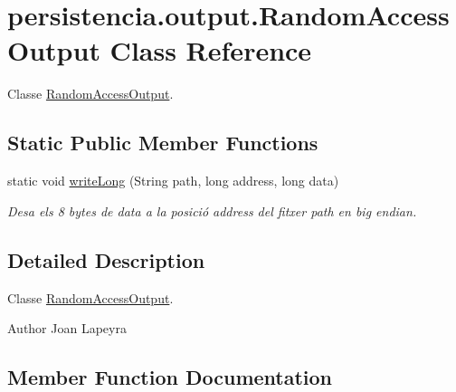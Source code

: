 \hypertarget{classpersistencia_1_1output_1_1RandomAccessOutput}{}\section{persistencia.\+output.\+Random\+Access\+Output Class Reference}
\label{classpersistencia_1_1output_1_1RandomAccessOutput}


Classe \hyperlink{classpersistencia_1_1output_1_1RandomAccessOutput}{Random\+Access\+Output}.  


\subsection*{Static Public Member Functions}
\begin{DoxyCompactItemize}
\item 
static void \hyperlink{classpersistencia_1_1output_1_1RandomAccessOutput_a204709eb802b6f934007c786a95ebe3f}{write\+Long} (String path, long address, long data)
\begin{DoxyCompactList}\small\item\em Desa els 8 bytes de data a la posició address del fitxer path en big endian. \end{DoxyCompactList}\end{DoxyCompactItemize}


\subsection{Detailed Description}
Classe \hyperlink{classpersistencia_1_1output_1_1RandomAccessOutput}{Random\+Access\+Output}. 

\begin{DoxyAuthor}{Author}
Joan Lapeyra 
\end{DoxyAuthor}


\subsection{Member Function Documentation}
\mbox{\label{classpersistencia_1_1output_1_1RandomAccessOutput_a204709eb802b6f934007c786a95ebe3f}} 
